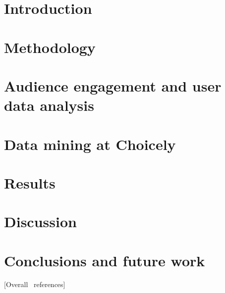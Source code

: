 \documentclass[english]{tktltiki}
\begin{document}
\mytableofcontents
	\section{Introduction}
	\label{section::introduction}
	
	\pagebreak
	
	\section{Methodology}
	\label{section::methodology}
	
	\pagebreak
	
	\section{Audience engagement and user data analysis}
	\label{section::audience-engagement-and-user-data-analysis}
	
	\pagebreak
	
	\section{Data mining at Choicely}
	\label{section::data-mining-at-choicely}
	
	\pagebreak

	\section{Results}
	\label{section::results}
	
	\pagebreak

	\section{Discussion}
	\label{section::discussion}
	
	\pagebreak

	\section{Conclusions and future work}
	\label{section::conclusions}
	
\pagebreak

[Overall \ references]

\nocite{*}



\lastpage
\appendices
\pagestyle{empty}

%
%
\end{document}
